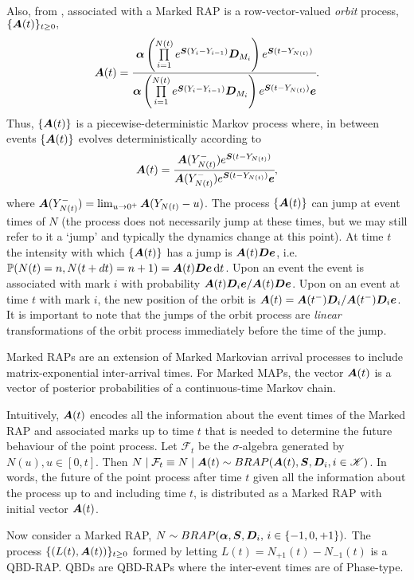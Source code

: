 Also, from \cite{bn2010}, associated with a Marked RAP is a row-vector-valued \emph{orbit} process, \(\{\boldsymbol A(t)\}_{t\geq0},\)
\[\boldsymbol A(t) = \cfrac{\boldsymbol \alpha\left( \prod\limits_{i=1}^{N(t)} e^{\boldsymbol S(Y_{i}-Y_{i-1})}\boldsymbol D_{M_i}\right)e^{\boldsymbol S (t-Y_{N(t)})}}{\boldsymbol \alpha\left( \prod\limits_{i=1}^{N(t)} e^{\boldsymbol S(Y_{i}-Y_{i-1})}\boldsymbol D_{M_i}\right)e^{\boldsymbol S( t-Y_{N(t)})}\boldsymbol e}.\]
Thus, \(\{\boldsymbol A(t)\}\) is a piecewise-deterministic Markov process where, in between events \(\{\boldsymbol A(t)\}\) evolves deterministically according to 
\[\boldsymbol A(t) = \cfrac{\boldsymbol A(Y_{N(t)}^-)e^{\boldsymbol S(t-Y_{N(t)})}}{\boldsymbol A(Y_{N(t)}^-)e^{\boldsymbol S(t-Y_{N(t)})}\boldsymbol e},\]
where \(\boldsymbol A(Y_{N(t)}^-) = \lim_{u\to 0^+}\boldsymbol A(Y_{N(t)}-u)\). The process \(\{\boldsymbol A(t)\}\) can jump at event times of \(N\) (the process does not necessarily jump at these times, but we may still refer to it a `jump' and typically the dynamics change at this point). At time \(t\) the intensity with which \(\{\boldsymbol A(t)\}\) has a jump is \(\boldsymbol A(t) \boldsymbol D\boldsymbol e\), i.e.~\(\mathbb P(N(t)=n,N(t+dt)=n+1)=\boldsymbol A(t) \boldsymbol D\boldsymbol e\, \mathrm{d} t\). Upon an event the event is associated with mark \(i\) with probability \(\boldsymbol A(t) \boldsymbol D_i\boldsymbol e/\boldsymbol A(t) \boldsymbol D\boldsymbol e\). Upon on an event at time \(t\) with mark \(i\), the new position of the orbit is \(\boldsymbol A(t) = \boldsymbol A(t^-) \boldsymbol D_i/\boldsymbol A(t^-) \boldsymbol D_i\boldsymbol e\). It is important to note that the jumps of the orbit process are \emph{linear} transformations of the orbit process immediately before the time of the jump. 

Marked RAPs are an extension of Marked Markovian arrival processes to include matrix-exponential inter-arrival times. For Marked MAPs, the vector \(\boldsymbol A(t)\) is a vector of posterior probabilities of a continuous-time Markov chain. 

Intuitively, \(\boldsymbol A(t)\) encodes all the information about the event times of the Marked RAP and associated marks up to time \(t\) that is needed to determine the future behaviour of the point process. Let \(\mathcal F_{t}\) be the \(\sigma\)-algebra generated by \(N(u), u\in[0,t]\). Then \(N\mid \mathcal F_t \equiv N\mid \boldsymbol A(t) \sim BRAP(\boldsymbol A(t), \boldsymbol S, \boldsymbol D_i,i\in\mathscr K)\). In words, the future of the point process after time \(t\) given all the information about the process up to and including time \(t\), is distributed as a Marked RAP with initial vector \(\boldsymbol A(t)\). 

Now consider a Marked RAP, \(N\sim BRAP(\boldsymbol \alpha, \boldsymbol S, \boldsymbol D_i,\,i\in\{-1,0,+1\}).\) The process \(\{(L(t),\boldsymbol A(t))\}_{t\geq0}\) formed by letting \(L(t) = N_{+1}(t) - N_{-1}(t)\) is a QBD-RAP. QBDs are QBD-RAPs where the inter-event times are of Phase-type.


